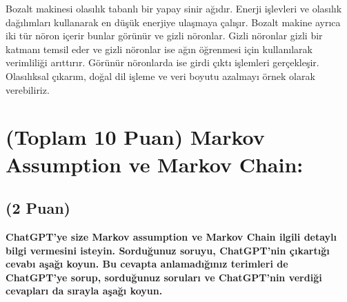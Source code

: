\documentclass[11pt]{article}
\begin{document}
Bozalt makinesi olasılık tabanlı bir yapay sinir ağıdır. Enerji işlevleri ve olasılık dağılımları kullanarak en düşük enerjiye ulaşmaya çalışır. Bozalt makine ayrıca iki tür nöron içerir bunlar görünür ve gizli nöronlar. Gizli nöronlar gizli bir katmanı temsil eder ve gizli nöronlar ise ağın öğrenmesi için kullanılarak verimliliği arıttırır. Görünür nöronlarda ise girdi çıktı işlemleri gerçekleşir. Olasılıksal çıkarım, doğal dil işleme ve veri boyutu azalmayı örnek olarak verebiliriz.

\section{(Toplam 10 Puan) Markov Assumption ve Markov Chain:}

\subsection{(2 Puan)} \textbf{ChatGPT’ye size Markov assumption ve Markov Chain ilgili detaylı bilgi vermesini isteyin. Sorduğunuz soruyu, ChatGPT'nin çıkartığı cevabı aşağı koyun. Bu cevapta anlamadığınız terimleri de ChatGPT’ye sorup, sorduğunuz soruları ve ChatGPT’nin verdiği cevapları da sırayla aşağı koyun.}
\end{document}
